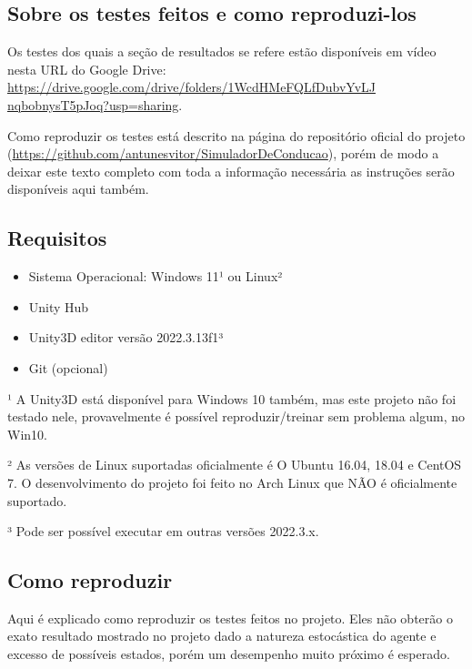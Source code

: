 \begin{apendicesenv}

\partapendices

\chapter{Sobre os testes feitos e como reproduzi-los}

Os testes dos quais a seção de resultados se refere estão disponíveis em vídeo nesta URL do Google Drive: \href{https://drive.google.com/drive/folders/1WcdHMeFQLfDubvYvLJnqbobnysT5pJoq?usp=sharing}{https://drive.google.com/drive/folders/1WcdHMeFQLfDubvYvLJ\\nqbobnysT5pJoq?usp=sharing}.

Como reproduzir os testes está descrito na página do repositório oficial do projeto (\href{https://github.com/antunesvitor/SimuladorDeConducao}{https://github.com/antunesvitor/SimuladorDeConducao}), porém de modo a deixar este texto completo com toda a informação necessária as instruções serão disponíveis aqui também.

\section*{Requisitos}

\begin{itemize}
    \item Sistema Operacional: Windows 11¹  ou Linux²
    \item Unity Hub
    \item Unity3D editor versão 2022.3.13f1³
    \item Git (opcional)
\end{itemize}

¹ A Unity3D está disponível para Windows 10 também, mas este projeto não foi testado nele, provavelmente é possível reproduzir/treinar sem problema algum, no Win10.

² As versões de Linux suportadas oficialmente é O Ubuntu 16.04, 18.04 e CentOS 7.  O desenvolvimento do projeto foi feito no Arch Linux que NÃO é oficialmente suportado.

³ Pode ser possível executar em outras versões 2022.3.x.

\section*{Como reproduzir} 
Aqui é explicado como reproduzir os testes feitos no projeto. Eles não obterão o exato resultado mostrado no projeto dado a natureza estocástica do agente e excesso de possíveis estados, porém um desempenho muito próximo é esperado.


\end{apendicesenv}
